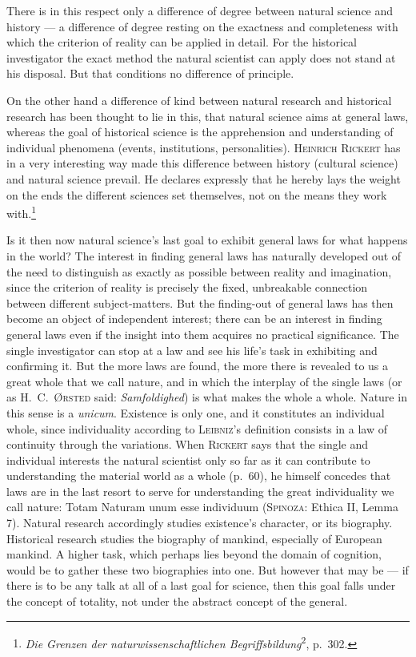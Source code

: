 \documentclass[12pt]{book}
\newcommand{\opage}[1]{\marginnote{\footnotesize\textit{[#1]}}}
\begin{document}
There is in this respect only a difference of degree between natural science and history
--- a difference of degree resting on the exactness and completeness with which the
criterion of reality can be applied in detail. For the historical investigator the exact
method the natural scientist can apply does not stand at his disposal. But that conditions
no difference of principle.

On the other hand a difference of kind between natural research and historical research has
been thought to lie in this, that natural science aims at general laws, whereas the goal of
historical science is the apprehension and understanding of individual phenomena (events,
institutions, personalities). \textsc{Heinrich Rickert} has in a very interesting way made
this difference between history (cultural science) and natural science prevail. He declares
expressly that he hereby lays the weight on the ends the different sciences set themselves,
not on the means they work with.\footnote{\textit{Die Grenzen der naturwissenschaftlichen
Begriffsbildung}\textsuperscript{2}, p.\ 302.}

Is it then now natural science's last goal to exhibit general laws for what happens in the
world? The interest in finding general laws has naturally developed out of the need to
distinguish as exactly as possible between reality and imagination, since the criterion of
reality is precisely the fixed, unbreakable connection between different subject-matters.
But the finding-out of general laws has then become an object of independent interest;
there can be an interest in finding general \opage{65}laws even if the insight into them acquires no
practical significance. The single investigator can stop at a law and see his life's task
in exhibiting and confirming it. But the more laws are found, the more there is revealed to
us a great whole that we call nature, and in which the interplay of the single laws (or as
\textsc{H.\ C.\ Ørsted} said: \textit{Samfoldighed}) is what makes the whole a whole. Nature
in this sense is a \textit{unicum}. Existence is only one, and it constitutes an individual
whole, since individuality according to \textsc{Leibniz}'s definition consists in a law of
continuity through the variations. When \textsc{Rickert} says that the single and individual
interests the natural scientist only so far as it can contribute to understanding the
material world as a whole (p.\ 60), he himself concedes that laws are in the last resort to
serve for understanding the great individuality we call nature: Totam Naturam unum esse
individuum (\textsc{Spinoza}: Ethica II, Lemma 7). Natural research accordingly studies
existence's character, or its biography. Historical research studies the biography of
mankind, especially of European mankind. A higher task, which perhaps lies beyond the domain
of cognition, would be to gather these two biographies into one. But however that may be ---
if there is to be any talk at all of a last goal for science, then this goal falls under the
concept of totality, not under the abstract concept of the general.
\end{document}
